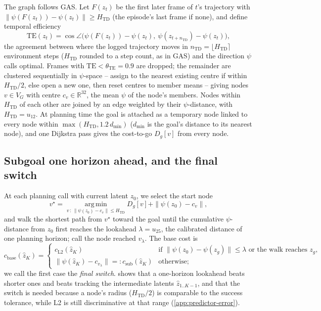 \documentclass{article} %
\newcommand{\z}{z}
\newcommand{\psiT}{\psi}
\newcommand{\Htd}{H_{\mathrm{TD}}}
\begin{document}
The graph follows GAS. Let $F(\z_t)$ be the first later frame of $t$'s trajectory with
$\|\psiT(F(\z_t))-\psiT(\z_t)\|\ge\Htd$ (the episode's last frame if none), and define temporal
efficiency
\begin{equation}
  \mathrm{TE}(\z_t)=\cos\angle\big(\psiT(F(\z_t))-\psiT(\z_t),\ \psiT(\z_{t+n_{\mathrm{TD}}})-\psiT(\z_t)\big),
  \label{eq:te}
\end{equation}
the agreement between where the logged trajectory moves in $n_{\mathrm{TD}}=\lfloor\Htd\rceil$
environment steps ($\Htd$ rounded to a step count, as in GAS) and the direction $\psiT$ calls
optimal. Frames with $\mathrm{TE}<\theta_{\mathrm{TE}}=0.9$ are dropped; the remainder are
clustered sequentially in $\psiT$-space -- assign to the nearest existing centre if within
$\Htd/2$, else open a new one, then reset centres to member means -- giving nodes $v\in V_G$ with
centre $c_v\in\mathbb{R}^{32}$, the mean $\psiT$ of the node's members. Nodes within $\Htd$ of each
other are joined by an edge weighted by their $\psiT$-distance, with $\Htd=u_{12}$. At planning
time the goal is attached as a temporary node linked to every node within $\max(\Htd,1.2\,d_{\min})$
($d_{\min}$ is the goal's distance to its nearest node), and one Dijkstra pass gives the cost-to-go
$D_g[v]$ from every node.

\subsection{Subgoal one horizon ahead, and the final switch}
\label{sec:subgoal}
At each planning call with current latent $\z_0$, we select the start node
\begin{equation}
  v^\star=\operatorname*{arg\,min}_{v\,:\,\|\psiT(\z_0)-c_v\|\le\Htd} D_g[v]+\|\psiT(\z_0)-c_v\|,
  \label{eq:startnode}
\end{equation}
and walk the shortest path from $v^\star$ toward the goal until the cumulative $\psiT$-distance
from $\z_0$ first reaches the lookahead $\lambda=u_{25}$, the calibrated distance of one planning
horizon; call the node reached $v_\lambda$. The base cost is
\begin{equation}
  c_{\mathrm{base}}(\hat\z_K)=
  \begin{cases}
    c_{\mathrm{L2}}(\hat\z_K) & \text{if } \|\psiT(\z_0)-\psiT(\z_g)\|\le\lambda
      \text{ or the walk reaches }\z_g,\\[2pt]
    \|\psiT(\hat\z_K)-c_{v_\lambda}\| =: c_{\mathrm{sub}}(\hat\z_K) & \text{otherwise;}
  \end{cases}
  \label{eq:subgoal}
\end{equation}
we call the first case the \emph{final switch}.  shows that a one-horizon
lookahead beats shorter ones and beats tracking the intermediate latents $\hat\z_{1..K-1}$, and
that the switch is needed because a node's radius ($\Htd/2$) is comparable to the success
tolerance, while L2 is still discriminative at that range (\cref{app:predictor-error}).
\end{document}

